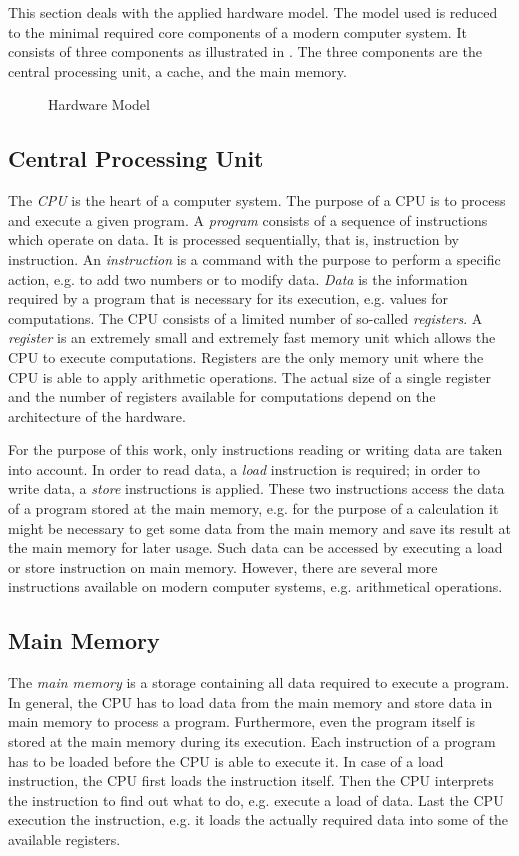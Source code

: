 \documentclass[onecolumn, openright, master, english, signatures]{dbrgrptt}
\begin{document}
This section deals with the applied hardware model. The model used is reduced to the minimal required core components of a modern computer system. It consists of three components as illustrated in . The three components are the central processing unit, a cache, and the main memory.

\begin{figure}[!ht]
  \centering
  
  \caption{Hardware Model}
  \label{fig:hardware-model}
\end{figure}

\subsection{Central Processing Unit}
The \emph{\ac{CPU}} is the heart of a computer system. The purpose of a \ac{CPU} is to process and execute a given program. A \emph{program} consists of a sequence of instructions which operate on data. It is processed sequentially, that is, instruction by instruction. An \emph{instruction} is a command with the purpose to perform a specific action, e.g. to add two numbers or to modify data. \emph{Data} is the information required by a program that is necessary for its execution, e.g. values for computations. The \ac{CPU} consists of a limited number of so-called \emph{registers}. A \emph{register} is an extremely small and extremely fast memory unit which allows the \ac{CPU} to execute computations. Registers are the only memory unit where the \ac{CPU} is able to apply arithmetic operations. The actual size of a single register and the number of registers available for computations depend on the architecture of the hardware.

For the purpose of this work, only instructions reading or writing data are taken into account. In order to read data, a \emph{load} instruction is required; in order to write data, a \emph{store} instructions is applied. These two instructions access the data of a program stored at the main memory, e.g. for the purpose of a calculation it might be necessary to get some data from the main memory and save its result at the main memory for later usage. Such data can be accessed by executing a load or store instruction on main memory. However, there are several more instructions available on modern computer systems, e.g. arithmetical operations.

\subsection{Main Memory}
The \emph{main memory} is a storage containing all data required to execute a program. In general, the \ac{CPU} has to load data from the main memory and store data in main memory to process a program. Furthermore, even the program itself is stored at the main memory during its execution. Each instruction of a program has to be loaded before the \ac{CPU} is able to execute it. In case of a load instruction, the \ac{CPU} first loads the instruction itself. Then the CPU interprets the instruction to find out what to do, e.g. execute a load of data. Last the \ac{CPU} execution the instruction, e.g. it loads the actually required data into some of the available registers.
\end{document}
